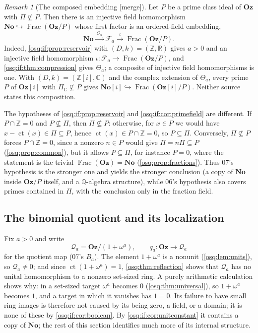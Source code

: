 \documentclass[11pt,letterpaper]{article}
\numberwithin{equation}{section}
\theoremstyle{definition}
\theoremstyle{remark}
\newtheorem{remark}[remark]{Remark}
\theoremstyle{plain}
\newcommand{\No}{\mathbf{No}}
\newcommand{\Oz}{\mathbf{Oz}}
\newcommand{\SC}{\No[i]}
\newcommand{\GOz}{\Oz[i]}
\newcommand{\Z}{\mathbb Z}
\newcommand{\Q}{\mathbb Q}
\newcommand{\R}{\mathbb R}
\newcommand{\C}{\mathbb C}
\newcommand{\FF}{\mathscr F}         %
\newcommand{\Qa}{\mathcal Q}         %
\newcommand{\ct}{\operatorname{ct}}
\newcommand{\Frac}{\operatorname{Frac}}
\newcommand{\merge}{\textup{\textsf{[merge]}}}
\begin{document}
\begin{remark}[The composed embedding \merge]\label{osq:if:rem:composition}
Let $P$ be a prime class ideal of $\Oz$ with $\Pi\not\subseteq P$. Then there is an
injective field homomorphism $\No\hookrightarrow\Frac(\Oz/P)$ whose first factor is an
ordered-field embedding,
\[
 \No\xrightarrow{\ \Theta_a\ }\FF_a\xrightarrow{\ \iota\ }\Frac(\Oz/P).
\]
Indeed, \cref{osq:if:prop:reservoir} with $(D,k)=(\Z,\R)$ gives $a>0$ and an injective field
homomorphism $\iota:\FF_a\to\Frac(\Oz/P)$, and \cref{osq:if:thm:compression} gives
$\Theta_a$; a composite of injective field homomorphisms is one. With $(D,k)=(\Z[i],\C)$ and
the complex extension of $\Theta_a$, every prime $P$ of $\GOz$ with $\Pi_\C\not\subseteq P$
gives $\SC\hookrightarrow\Frac(\GOz/P)$. Neither source states this composition.

The hypotheses of \cref{osq:if:prop:reservoir} and \cref{osq:if:cor:primefield} are
different. If $P\cap\Z=0$ and $P\not\subseteq\Pi$, then $\Pi\not\subseteq P$: otherwise,
for $x\in P$ we would have $x-\ct(x)\in\Pi\subseteq P$, hence $\ct(x)\in P\cap\Z=0$, so
$P\subseteq\Pi$. Conversely, $\Pi\not\subseteq P$ forces $P\cap\Z=0$, since a nonzero
$n\in P$ would give $\Pi=n\Pi\subseteq P$ (\cref{osq:prop:common}), but it allows
$P\subseteq\Pi$, for instance $P=0$, where the statement is the trivial
$\Frac(\Oz)=\No$ (\cref{osq:prop:fractions}). Thus 07's hypothesis is the stronger one and
yields the stronger conclusion (a copy of $\No$ inside $\Oz/P$ itself, and a
$\Q$-algebra structure), while 06's hypothesis also covers primes contained in $\Pi$, with
the conclusion only in the fraction field.
\end{remark}

\subsection{The binomial quotient and its localization}\label{osq:if:sub:binomial}

Fix $a>0$ and write
\[
 \Qa_a=\Oz/(1+\omega^a),\qquad q_a:\Oz\longrightarrow\Qa_a
\]
for the quotient map (07's $B_a$). The element $1+\omega^a$ is a nonunit
(\cref{osq:lem:units}), so $\Qa_a\ne0$; and since $\ct(1+\omega^a)=1$,
\cref{osq:thm:reflection} shows that $\Qa_a$ has no unital homomorphism to a nonzero
set-sized ring. A purely arithmetic calculation shows why: in a set-sized target
$\omega^a$ becomes $0$ (\cref{osq:thm:universal}), so $1+\omega^a$ becomes $1$, and a
target in which it vanishes has $1=0$. Its failure to have small ring images is therefore
not caused by its being zero, a field, or a domain; it is none of these by
\cref{osq:if:cor:boolean}. By \cref{osq:if:cor:unitconstant} it contains a copy of $\No$;
the rest of this section identifies much more of its internal structure.
\end{document}
